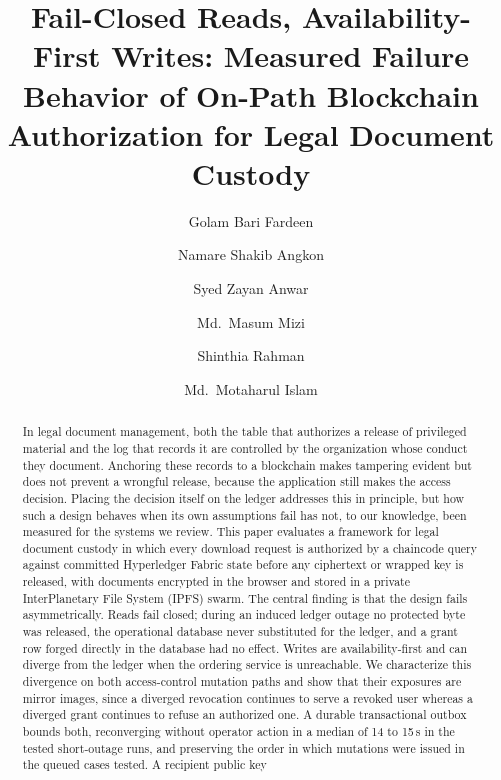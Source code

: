 \documentclass[preprint,12pt]{elsarticle}
\begin{document}
\begin{frontmatter}

\title{Fail-Closed Reads, Availability-First Writes: Measured Failure Behavior
of On-Path Blockchain Authorization for Legal Document Custody}

\author[uiu]{Golam Bari Fardeen}
\author[uiu]{Namare Shakib Angkon}
\author[uiu]{Syed Zayan Anwar}
\author[uiu]{Md.\ Masum Mizi}
\author[uiu]{Shinthia Rahman}
\author[uiu]{Md.\ Motaharul Islam}


\begin{abstract}
In legal document management, both the table that authorizes a release of
privileged material and the log that records it are controlled by the
organization whose conduct they document. Anchoring these records to a
blockchain makes tampering evident but does not prevent a wrongful release,
because the application still makes the access decision. Placing the decision
itself on the ledger addresses this in principle, but how such a design behaves
when its own assumptions fail has not, to our knowledge, been measured for
the systems we review. This paper
evaluates a framework for legal document custody in which every download request
is authorized by a chaincode query against committed Hyperledger Fabric state
before any ciphertext or wrapped key is released, with documents encrypted in
the browser and stored in a private InterPlanetary File System (IPFS) swarm. The
central finding is that the design fails asymmetrically. Reads fail closed;
during an induced ledger outage no protected byte was released, the operational
database never substituted for the ledger, and a grant row forged directly in
the database had no effect. Writes are availability-first and can diverge from
the ledger when the ordering service is unreachable. We characterize this
divergence on both access-control mutation paths and show that their exposures
are mirror images, since a diverged revocation continues to serve a revoked user
whereas a diverged grant continues to refuse an authorized one. A durable
transactional outbox bounds both, reconverging without operator action in a
median of 14 to 15\,s in the tested short-outage runs, and preserving the order
in which mutations were issued in the queued cases tested. A recipient public key

\end{abstract}
\end{frontmatter}
\end{document}
